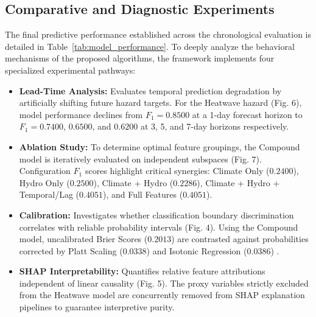 \subsection{Comparative and Diagnostic Experiments}
The final predictive performance established across the chronological evaluation is detailed in Table~\ref{tab:model_performance}. To deeply analyze the behavioral mechanisms of the proposed algorithms, the framework implements four specialized experimental pathways:
\begin{itemize}
    \item \textbf{Lead-Time Analysis:} Evaluates temporal prediction degradation by artificially shifting future hazard targets. For the Heatwave hazard (Fig. 6), model performance declines from $F_1 = 0.8500$ at a 1-day forecast horizon to $F_1 = 0.7400$, $0.6500$, and $0.6200$ at 3, 5, and 7-day horizons respectively. 
    \item \textbf{Ablation Study:} To determine optimal feature groupings, the Compound model is iteratively evaluated on independent subspaces (Fig. 7). Configuration $F_1$ scores highlight critical synergies: Climate Only ($0.2400$), Hydro Only ($0.2500$), Climate + Hydro ($0.2286$), Climate + Hydro + Temporal/Lag ($0.4051$), and Full Features ($0.4051$).
    \item \textbf{Calibration:} Investigates whether classification boundary discrimination correlates with reliable probability intervals (Fig. 4). Using the Compound model, uncalibrated Brier Scores ($0.2013$) are contrasted against probabilities corrected by Platt Scaling ($0.0338$) \cite{Platt1999} and Isotonic Regression ($0.0386$) \cite{Zadrozny2002}. 
    \item \textbf{SHAP Interpretability:} Quantifies relative feature attributions independent of linear causality (Fig. 5). The proxy variables strictly excluded from the Heatwave model are concurrently removed from SHAP explanation pipelines to guarantee interpretive purity.
\end{itemize}

\begin{table}[htbp]
\caption{Final Offline Test Performance (2016--2018)}
\begin{center}
\label{tab:model_performance}
\end{center}
\end{table}

